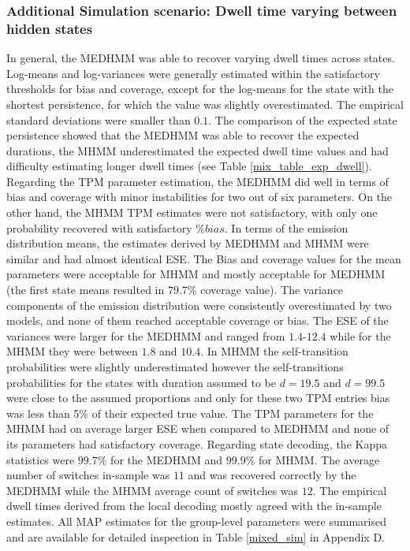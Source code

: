 \subsubsection{Additional Simulation scenario: Dwell time varying between hidden states}
 In general, the MEDHMM was able to recover varying dwell times across states. Log-means and log-variances were generally estimated within the satisfactory thresholds for bias and coverage, except for the log-means for the state with the shortest persistence, for which the value was slightly overestimated. The empirical standard deviations were smaller than $0.1$. The comparison of the expected state persistence showed that the MEDHMM was able to recover the expected durations, the MHMM underestimated the expected dwell time values and had difficulty estimating longer dwell times (see Table \ref{mix_table_exp_dwell}). Regarding the TPM parameter estimation, the MEDHMM did well in terms of bias and coverage with minor instabilities for two out of six parameters. On the other hand, the MHMM TPM estimates were not satisfactory, with only one probability recovered with satisfactory $\%bias$. In terms of the emission distribution means, the estimates derived by MEDHMM and MHMM were similar and had almost identical ESE. The Bias and coverage values for the mean parameters were acceptable for MHMM and mostly acceptable for MEDHMM (the first state means resulted in  $79.7\%$ coverage value). The variance components of the emission distribution were consistently overestimated by two models, and none of them reached acceptable coverage or bias. The ESE of the variances were larger for the MEDHMM and ranged from $1.4$-$12.4$ while for the MHMM they were between $1.8$ and $10.4$. In MHMM the self-transition probabilities were slightly underestimated however the self-transitions probabilities for the states with duration assumed to be $d=19.5$ and $d=99.5$ were close to the assumed proportions and only for these two TPM entries bias was less than 5\% of their expected true value. The TPM parameters for the MHMM had on average larger ESE when compared to MEDHMM and none of its parameters had satisfactory coverage. Regarding state decoding, the Kappa statistics were $99.7\%$ for the MEDHMM
and $99.9\%$ for MHMM. The average number of switches in-sample was $11$ and was recovered correctly by the MEDHMM while the MHMM average count of switches was $12$. The empirical dwell times derived from the local decoding mostly agreed with the in-sample estimates.  
All MAP estimates for the group-level parameters were summarised and are available for detailed inspection in Table \ref{mixed_sim} in Appendix D.

